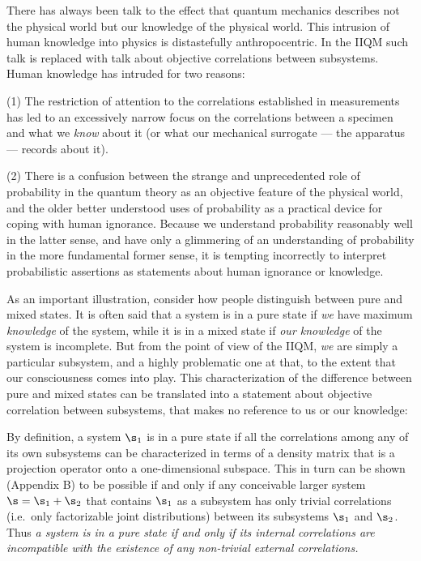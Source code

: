 \bigskip
{} 
\medskip

There has always been talk to the effect that quantum mechanics
describes not the physical world but our knowledge of the physical
world.  This intrusion of human knowledge into physics is
distastefully anthropocentric.  In the IIQM such talk is replaced with
talk about objective correlations between subsystems.  Human knowledge
has intruded for two reasons:

(1) The restriction of attention to the correlations established in
measurements has led to an excessively narrow focus on the correlations
between a specimen and what we {\it know\/} about it (or what our
mechanical surrogate --- the apparatus --- records about
it). 

(2) There is a confusion between the strange and
unprecedented role of probability in the quantum theory as an
objective feature of the physical world, and the older better
understood uses of probability as a practical device for coping with
human ignorance.  Because we understand probability reasonably well in
the latter sense, and have only a glimmering of an understanding of
probability in the more fundamental former sense, it is tempting
incorrectly to interpret probabilistic assertions as statements about
human ignorance or knowledge.  

As an important illustration, consider how people distinguish
between pure and mixed states.  It is often said that a system is in a
pure state if {\it we\/} have maximum {\it knowledge\/} of the system,
while it is in a mixed state if {\it our knowledge\/} of the system is
incomplete.  But from the point of view of the IIQM, {\it we\/} are
simply a particular subsystem, and a highly problematic one at that,
to the extent that our consciousness comes into play.  This
characterization of the difference between pure and mixed states can
be translated into a statement about objective correlation between
subsystems, that makes no reference to us or our knowledge:  

By definition, a system $\s_1$ is in a pure state if all the
correlations among any of its own subsystems can be characterized in
terms of a density matrix that is a projection operator onto a
one-dimensional subspace.  This in turn can be shown (Appendix B) to
be possible if and only if any conceivable larger system $\s =
\s_1 + \s_2$ that contains $\s_1$ as a subsystem has only trivial
correlations (i.e.~only factorizable joint distributions) between its
subsystems $\s_1$ and $\s_2$.  Thus {\it a system is in a pure state
if and only if its internal correlations are incompatible with the
existence of any non-trivial external correlations.\/} 

